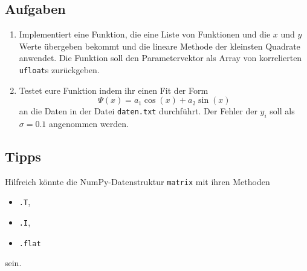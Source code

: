 \documentclass{scrartcl}
\begin{document}
\subsection*{Aufgaben}
\begin{enumerate}
    \item Implementiert eine Funktion, die eine Liste von Funktionen und die $x$ und $y$ Werte übergeben bekommt und die lineare Methode der kleinsten Quadrate anwendet. 
        Die Funktion soll den Parametervektor als Array von korrelierten \texttt{ufloat}s zurückgeben.
    \item Testet eure Funktion indem ihr einen Fit der Form
        \begin{equation}
            \Psi(x) = a_1 \cos(x) + a_2 \sin(x)
        \end{equation}
        an die Daten in der Datei \texttt{daten.txt} durchführt.
        Der Fehler der $y_i$ soll als $\sigma = \num{0.1}$ angenommen werden.
\end{enumerate}

\subsection*{Tipps}
Hilfreich könnte die NumPy-Datenstruktur \texttt{matrix} mit ihren Methoden 
\begin{itemize}
    \item \texttt{.T},
    \item \texttt{.I},
    \item \texttt{.flat}
\end{itemize}
sein.
\end{document}
